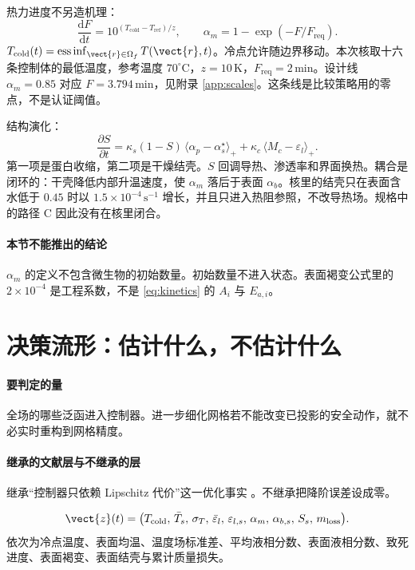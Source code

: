 热力进度不另造机理：
\begin{equation}
\label{eq:F}
\frac{\mathrm{d}F}{\mathrm{d}t}=10^{(T_{\mathrm{cold}}-T_{\mathrm{ref}})/z},\qquad
\alpha_m=1-\exp(-F/F_{\mathrm{req}}).
\end{equation}
\(T_{\mathrm{cold}}(t)=\operatorname{ess\,inf}_{\vect{r}\in\Omega_f}T(\vect{r},t)\)。冷点允许随边界移动。本次核取十六条控制体的最低温度，参考温度 \(70^\circ\mathrm{C}\)，\(z=10\,\mathrm{K}\)，\(F_{\mathrm{req}}=2\,\mathrm{min}\)。设计线 \(\alpha_m=0.85\) 对应 \(F=3.794\,\mathrm{min}\)，见附录 \ref{app:scales}。这条线是比较策略用的零点，不是认证阈值。

结构演化：
\begin{equation}
\label{eq:structure}
\frac{\partial S}{\partial t}
=\kappa_s(1-S)\,\langle\alpha_p-\alpha_s^\star\rangle_+
+\kappa_c\,\langle M_{c}- \varepsilon_l\rangle_+.
\end{equation}
第一项是蛋白收缩，第二项是干燥结壳。\(S\) 回调导热、渗透率和界面换热。耦合是闭环的：干壳降低内部升温速度，使 \(\alpha_m\) 落后于表面 \(\alpha_b\)。核里的结壳只在表面含水低于 \(0.45\) 时以 \(1.5\times 10^{-4}\,\mathrm{s}^{-1}\) 增长，并且只进入热阻参照，不改导热场。规格中的路径 C 因此没有在核里闭合。

\paragraph{本节不能推出的结论}
\(\alpha_m\) 的定义不包含微生物的初始数量。初始数量不进入状态。表面褐变公式里的 \(2\times 10^{-4}\) 是工程系数，不是 \eqref{eq:kinetics} 的 \(A_i\) 与 \(E_{a,i}\)。

\section{决策流形：估计什么，不估计什么}

\paragraph{要判定的量}
全场的哪些泛函进入控制器。进一步细化网格若不能改变已投影的安全动作，就不必实时重构到网格精度。

\paragraph{继承的文献层与不继承的层}
继承“控制器只依赖 Lipschitz 代价”这一优化事实 \cite{rawlings2017}。不继承把降阶误差设成零。

\begin{definition}[决策状态]
\label{def:decision}
\begin{equation}
\label{eq:z}
\vect{z}(t)=\big(
T_{\mathrm{cold}},\,
\bar T_s,\,
\sigma_T,\,
\bar\varepsilon_l,\,
\varepsilon_{l,s},\,
\alpha_m,\,
\alpha_{b,s},\,
S_s,\,
m_{\mathrm{loss}}
\big).
\end{equation}
依次为冷点温度、表面均温、温度场标准差、平均液相分数、表面液相分数、致死进度、表面褐变、表面结壳与累计质量损失。
\end{definition}

